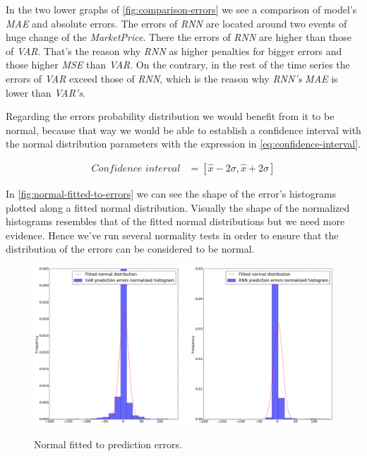 In the two lower graphs of \autoref{fig:comparison-errors} we see a
comparison of model's \textit{MAE} and absolute errors. The errors of
\textit{RNN} are located around two events of huge change of the
\textit{MarketPrice}. There the errors of \textit{RNN} are higher than
those of \textit{VAR}. That's the reason why \textit{RNN} as higher
penalties for bigger errors and those higher \textit{MSE} than
\textit{VAR}. On the contrary, in the rest of the time series
the errors of \textit{VAR} exceed those of \textit{RNN}, which is the
reason why \textit{RNN's} \textit{MAE} is lower than \textit{VAR's}.

Regarding the errors probability distribution we would benefit from it
to be normal, because that way we would be able to establish a
confidence interval with the normal distribution parameters with the
expression in \autoref{eq:confidence-interval}.

\begin{equation}
  \begin{aligned}
    \label{eq:confidence-interval}
    \textit{Confidence interval} & =
    [ \hat{x} - 2 \sigma, \hat{x} + 2 \sigma ]
  \end{aligned}
\end{equation}

In \autoref{fig:normal-fitted-to-errors} we can see the shape of the
error's histograms plotted along a fitted normal distribution.
Visually the shape of the normalized histograms resembles that of the
fitted normal distributions but we need more evidence. Hence we've run
several normality tests in order to ensure that the distribution of
the errors can be considered to be normal.

\begin{figure}[bth]
  \myfloatalign
  {
    \includegraphics[width=1\linewidth]
    {gfx/normal-fitted-to-errors}}
  \caption{Normal fitted to prediction errors.}
  \label{fig:normal-fitted-to-errors}
\end{figure}

